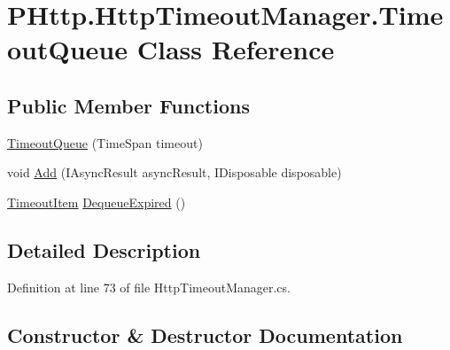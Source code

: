 \hypertarget{class_p_http_1_1_http_timeout_manager_1_1_timeout_queue}{}\section{P\+Http.\+Http\+Timeout\+Manager.\+Timeout\+Queue Class Reference}
\label{class_p_http_1_1_http_timeout_manager_1_1_timeout_queue}
\subsection*{Public Member Functions}
\begin{DoxyCompactItemize}
\item 
\hyperlink{class_p_http_1_1_http_timeout_manager_1_1_timeout_queue_a2e01f4f13edf54921b96a7a342112a77}{Timeout\+Queue} (Time\+Span timeout)
\item 
void \hyperlink{class_p_http_1_1_http_timeout_manager_1_1_timeout_queue_a7a055dc9b77f555d5cfe652326d8048a}{Add} (I\+Async\+Result async\+Result, I\+Disposable disposable)
\item 
\hyperlink{class_p_http_1_1_http_timeout_manager_1_1_timeout_item}{Timeout\+Item} \hyperlink{class_p_http_1_1_http_timeout_manager_1_1_timeout_queue_a6ac75d05c58ac3e93783167ad91824d5}{Dequeue\+Expired} ()
\end{DoxyCompactItemize}


\subsection{Detailed Description}


Definition at line 73 of file Http\+Timeout\+Manager.\+cs.



\subsection{Constructor \& Destructor Documentation}
\mbox{\label{class_p_http_1_1_http_timeout_manager_1_1_timeout_queue_a2e01f4f13edf54921b96a7a342112a77}} 
